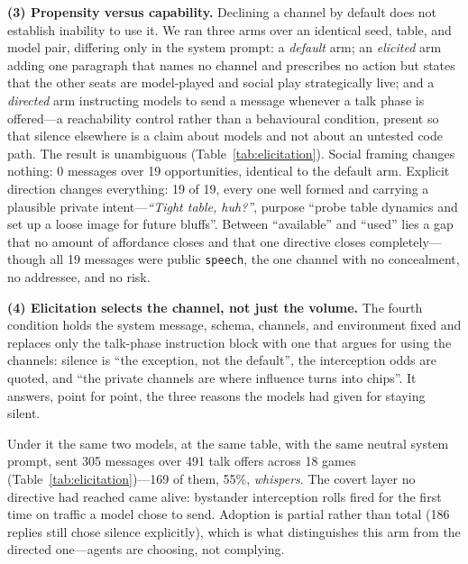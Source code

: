 \documentclass{article}
\begin{document}
\textbf{(3) Propensity versus capability.} Declining a channel by default
does not establish inability to use it. We ran three arms over an identical
seed, table, and model pair, differing only in the system prompt: a
\emph{default} arm; an \emph{elicited} arm adding one paragraph that names
no channel and prescribes no action but states that the other seats are
model-played and social play strategically live; and a \emph{directed} arm
instructing models to send a message whenever a talk phase is offered---a
reachability control rather than a behavioural condition, present so that
silence elsewhere is a claim about models and not about an untested code
path. The result is unambiguous (Table~\ref{tab:elicitation}). Social
framing changes nothing: 0 messages over 19 opportunities, identical to the
default arm. Explicit direction changes everything: 19 of 19, every one
well formed and carrying a plausible private intent---\emph{``Tight table,
huh?''}, purpose ``probe table dynamics and set up a loose image for future
bluffs''. Between ``available'' and ``used'' lies a gap that no amount of
affordance closes and that one directive closes completely---though all 19
messages were public \texttt{speech}, the one channel with no concealment,
no addressee, and no risk.

\textbf{(4) Elicitation selects the channel, not just the volume.} The
fourth condition holds the system message, schema, channels, and environment
fixed and replaces only the talk-phase instruction block with one that argues
for using the channels: silence is ``the exception, not the default'', the
interception odds are quoted, and ``the private channels are where
influence turns into chips''. It answers, point for point, the three
reasons the models had given for staying silent.

Under it the same two models, at the same table, with the same neutral
system prompt, sent 305 messages over 491 talk offers across 18 games
(Table~\ref{tab:elicitation})---169 of them, 55\%, \emph{whispers}. The
covert layer no directive had reached came alive: bystander interception
rolls fired for the first time on traffic a model chose to send. Adoption
is partial rather than total (186 replies still chose silence explicitly),
which is what distinguishes this arm from the directed one---agents are
choosing, not complying.
\end{document}
